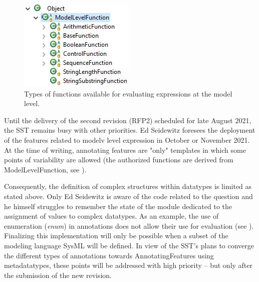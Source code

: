\begin{figure}[ht]     
	\centering
	\includegraphics[width=.35\linewidth]{images/modellevelfunction-type-hierarchy.JPG}
	\caption{Types of functions available for evaluating expressions at the model level.}
	\label{fig:modellevelfunc}
\end{figure}

Until the delivery of the second revision (RFP2) scheduled for late August 2021, the SST remains busy with other priorities. Ed Seidewitz foresees the deployment of the features related to modelv level expression in October or November 2021. At the time of writing, annotating features are "only" templates in which some points of variability are allowed (the authorized functions are derived from ModelLevelFunction, see ).

Consequently, the definition of complex structures within datatypes is limited as stated above. Only Ed Seidewitz is aware of the code related to the question and he himself struggles to remember the state of the module dedicated to the assignment of values to complex datatypes. As an example, the use of enumeration (\textit{enum}) in annotations does not allow their use for evaluation (see ). 
Finalizing this implementation will only be possible when a subset of the modeling language SysML will be defined. In view of the SST's plans to converge the different types of annotations towards AnnotatingFeatures using metadatatypes, these points will be addressed with high priority -- but only after the submission of the new revision.

